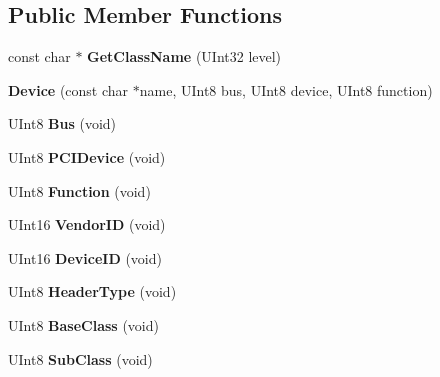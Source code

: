 \subsection*{Public Member Functions}
\begin{DoxyCompactItemize}
\item 
\mbox{\label{class_p_c_i_1_1_device_a4cd01dd207da8bec0782cea685ee3921}} 
const char $\ast$ {\bfseries Get\+Class\+Name} (U\+Int32 level)
\item 
\mbox{\label{class_p_c_i_1_1_device_a8c802a13f70f87f54515e18582697a7a}} 
{\bfseries Device} (const char $\ast$name, U\+Int8 bus, U\+Int8 device, U\+Int8 function)
\item 
\mbox{\label{class_p_c_i_1_1_device_ac156bded5416c390d6473b7ff10930f7}} 
U\+Int8 {\bfseries Bus} (void)
\item 
\mbox{\label{class_p_c_i_1_1_device_a4ca1d7ad6b1bbcdb26ce9c503be49988}} 
U\+Int8 {\bfseries P\+C\+I\+Device} (void)
\item 
\mbox{\label{class_p_c_i_1_1_device_a2693e3d5351ed5e885130ec69009c2e6}} 
U\+Int8 {\bfseries Function} (void)
\item 
\mbox{\label{class_p_c_i_1_1_device_af7ad0b76bfffb0530005d5bcfe45133b}} 
U\+Int16 {\bfseries Vendor\+ID} (void)
\item 
\mbox{\label{class_p_c_i_1_1_device_aa87d2a176e119d83dd028ca23e0eca97}} 
U\+Int16 {\bfseries Device\+ID} (void)
\item 
\mbox{\label{class_p_c_i_1_1_device_a05ea166817d3dbd1cb1156cf9af1310c}} 
U\+Int8 {\bfseries Header\+Type} (void)
\item 
\mbox{\label{class_p_c_i_1_1_device_a2b684ca6a69959339e2b7b48efc0bba5}} 
U\+Int8 {\bfseries Base\+Class} (void)
\item 
\mbox{\label{class_p_c_i_1_1_device_ab2f26fd2c025a104052c32ef40d1ca47}} 
U\+Int8 {\bfseries Sub\+Class} (void)

\end{DoxyCompactItemize}
